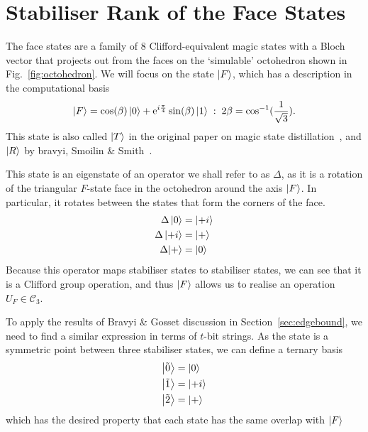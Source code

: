 \documentclass{standalone}
\begin{document}
\section{Stabiliser Rank of the Face States}\label{sec:frank}
The face states are a family of $8$ Clifford-equivalent magic states with a Bloch vector that projects out from the faces on the `simulable' octohedron shown in Fig.~\ref{fig:octohedron}. We will focus on the state $\ket{F}$, which has a description in the computational basis~\cite{Bravyi2005}
\begin{equation}\label{eq:Fstate}
\ket{F} = \cos(\beta)\ket{0}+\mathrm{e}^{i\frac{\pi}{4}}\sin(\beta)\ket{1}\;:\;2\beta = \cos^{-1}(\frac{1}{\sqrt{3}}).
\end{equation}
This state is also called $\ket{T}$ in the original paper on magic state distillation~\cite{Bravyi2005}, and $\ket{R}$ by bravyi, Smoilin \& Smith~\cite{Bravyi2015}.
\par
This state is an eigenstate of an operator we shall refer to as $\Delta$, as it is a rotation of the triangular $F$-state face in the octohedron around the axis $\ket{F}$. In particular, it rotates between the states that form the corners of the face.
\begin{align}
\begin{split}
    \Delta\ket{0} &= \ket{+i}\\
    \Delta\ket{+i} &= \ket{+} \\
    \Delta{\ket{+}} &= \ket{0} \\
\end{split}
\end{align}
Because this operator maps stabiliser states to stabiliser states, we can see that it is a Clifford group operation, and thus $\ket{F}$ allows us to realise an operation $U_{F}\in\mathcal{C}_{3}$.
\par
To apply the results of Bravyi \& Gosset discussion in Section~\ref{sec:edgebound}, we need to find a similar expression in terms of $t$-bit strings. As the state is a symmetric point between three stabiliser states, we can define a ternary basis
\begin{align}
\begin{split}
\ket{\tilde{0}} &= \ket{0}\\
\ket{\tilde{1}} &= \ket{+i}\\
\ket{\tilde{2}} &= \ket{+}\\
\end{split}
\end{align}
which has the desired property that each state has the same overlap with $\ket{F}$
\end{document}
